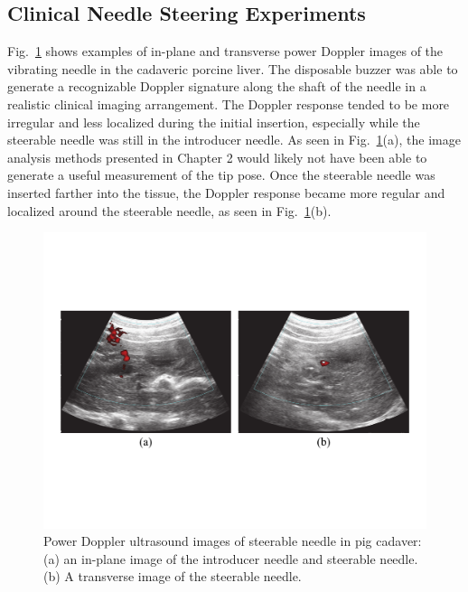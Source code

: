 \subsection{Clinical Needle Steering Experiments}
Fig.~\ref{fig:CadaverDoppler} shows examples of in-plane and transverse power Doppler images of the vibrating needle in the cadaveric porcine liver. The disposable buzzer was able to generate a recognizable Doppler signature along the shaft of the needle in a realistic clinical imaging arrangement. The Doppler response tended to be more irregular and less localized during the initial insertion, especially while the steerable needle was still in the introducer needle. As seen in Fig.~\ref{fig:CadaverDoppler}(a), the image analysis methods presented in Chapter 2 would likely not have been able to generate a useful measurement of the tip pose. Once the steerable needle was inserted farther into the tissue, the Doppler response became more regular and localized around the steerable needle, as seen in Fig.~\ref{fig:CadaverDoppler}(b). 

\begin{figure}[!t]
\centering
\includegraphics[width = \columnwidth]{./Images/Chapter5/CadaverDoppler/CadaverDoppler.pdf}%
\caption[Power Doppler ultrasound images of steerable needle in pig cadaver]{Power Doppler ultrasound images of steerable needle in pig cadaver: (a) an in-plane image of the introducer needle and steerable needle. (b) A transverse image of the steerable needle.  }
\label{fig:CadaverDoppler}
\end{figure}  

